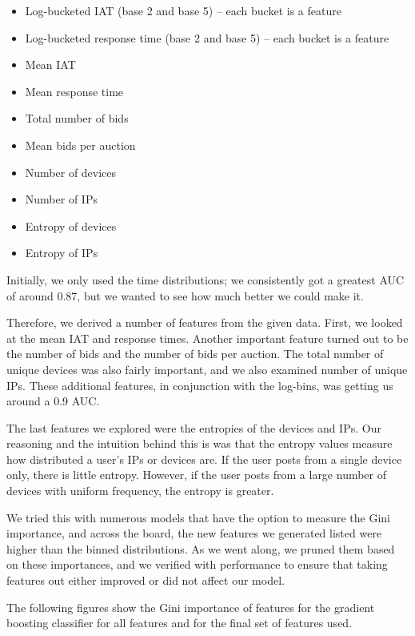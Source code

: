 \documentclass{article} %
\begin{document}
\begin{itemize}
\item Log-bucketed IAT (base 2 and base 5) -- each bucket is a feature
\item Log-bucketed response time (base 2 and base 5) -- each bucket is a feature
\item Mean IAT
\item Mean response time
\item Total number of bids
\item Mean bids per auction
\item Number of devices
\item Number of IPs
\item Entropy of devices
\item Entropy of IPs
\end{itemize}

Initially, we only used the time distributions; we consistently got a greatest AUC of around 0.87, but we wanted to see how much better we could make it.

Therefore, we derived a number of features from the given data.
First, we looked at the mean IAT and response times.
Another important feature turned out to be the number of bids and the number of bids per auction.
The total number of unique devices was also fairly important, and we also examined number of unique IPs.
These additional features, in conjunction with the log-bins, was getting us around a 0.9 AUC.

The last features we explored were the entropies of the devices and IPs.
Our reasoning and the intuition behind this is was that the entropy values measure how distributed a user's IPs or devices are.
If the user posts from a single device only, there is little entropy.
However, if the user posts from a large number of devices with uniform frequency, the entropy is greater.

We tried this with numerous models that have the option to measure the Gini importance, and across the board, the new features we generated listed were higher than the binned distributions.
As we went along, we pruned them based on these importances, and we verified with performance to ensure that taking features out either improved or did not affect our model.

The following figures show the Gini importance of features for the gradient boosting classifier for all features and for the final set of features used.
\end{document}
